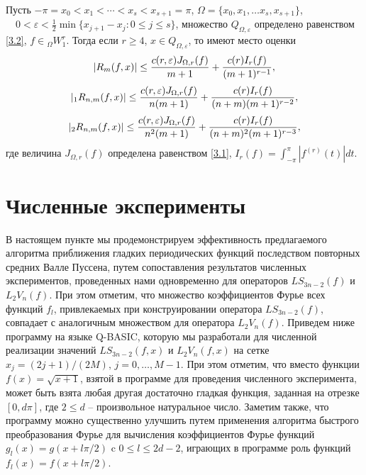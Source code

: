 \begin{theorem}
 Пусть $-\pi=x_0<x_1<\cdots<x_s<x_{s+1}=\pi$, $\Omega=\{x_0,x_1,\ldots x_s,x_{s+1}\}$,  $\quad 0<\varepsilon<\frac12\min\{x_{j+1}-x_{j}:0\le j\le s\}$, множество $Q_{\Omega,\varepsilon}$ определено равенством \eqref{3.2},
$f\in {}_\Omega W_1^r$. Тогда если $r\ge4$, $x\in Q_{\Omega,\varepsilon}$, то
имеют место оценки
$$
|R_{m}(f,x)|\le{c(r,\varepsilon)J_{\Omega,r}(f)\over m+1}+{c(r)I_r(f)\over (m+1)^{r-1}},
$$
$$
|_1R_{n,m}(f,x)|\le{c(r,\varepsilon)J_{\Omega,r}(f)\over n(m+1)}+{c(r)I_r(f)\over (n+m)(m+1)^{r-2}},
$$
$$
|_2R_{n,m}(f,x)|\le{c(r,\varepsilon)J_{\Omega,r}(f)\over n^2(m+1)}+{c(r)I_r(f)\over (n+m)^2(m+1)^{r-3}},
$$
где величина $J_{\Omega,r}(f)$ определена равенством \eqref{3.1},
 $I_r(f)=\int_{-\pi}^{\pi}|f^{(r)}(t)|dt$.
\end{theorem}















\section{Численные эксперименты }\label{s5}
В настоящем пункте мы продемонстрируем эффективность предлагаемого алгоритма приближения гладких периодических функций последством повторных средних Валле Пуссена, путем сопоставления результатов численных экспериментов, проведенных нами одновременно для операторов $LS_{3n-2}(f)$ и $L_2V_n(f)$. При этом отметим, что множество коэффициентов Фурье всех функций $f_l$, привлекаемых  при конструировании оператора $LS_{3n-2}(f)$,  совпадает с аналогичным множеством для оператора $L_2V_n(f)$. Приведем ниже программу на языке Q-BASIC, которую мы разработали для численной реализации значений  $LS_{3n-2}(f,x)$ и $L_2V_n(f,x)$ на сетке $x_j=(2j+1)/(2M), \,j=0,\ldots,M-1$. При этом отметим, что вместо функции $f(x)=\sqrt{x+1}$, взятой  в программе для проведения численного эксперимента, может быть взята любая другая достаточно гладкая функция, заданная на отрезке $[0,d\pi]$, где $2\le d$ -- произвольное натуральное число.  Заметим также, что программу можно существенно улучшить путем применения алгоритма быстрого преобразования Фурье для вычисления коэффициентов Фурье функций $g_l(x)=g(x+l\pi/2)$ c $0\le l\le 2d-2$, играющих   в программе роль функций $f_l(x)=f(x+l\pi/2)$.


